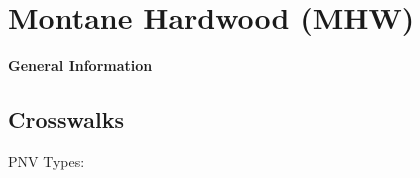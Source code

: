 \documentclass{article}
\begin{document}
\renewcommand{\arraystretch}{1.1}


\section*{\LARGE{Montane Hardwood (MHW)}}

\begin{snugshade}\Large \textbf{General Information} \end{snugshade}

\subsection*{Crosswalks}
PNV Types:\\
\tiny 
\end{document}

